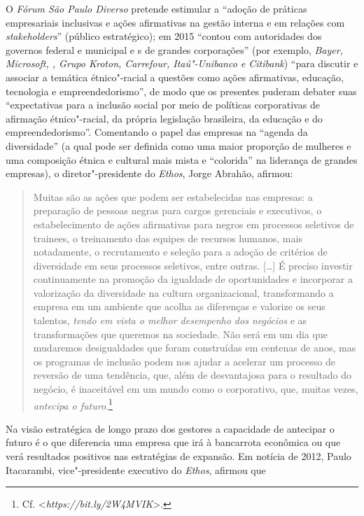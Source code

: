 O \emph{Fórum São Paulo Diverso} pretende estimular a ``adoção de
práticas empresariais inclusivas e ações afirmativas na gestão interna e
em relações com \emph{stakeholders}'' (público estratégico); em 2015
``contou com autoridades dos governos federal e municipal e s de
grandes corporações'' (por exemplo, \emph{Bayer, Microsoft, , Grupo
Kroton, Carrefour, Itaú"-Unibanco e Citibank}) ``para discutir e associar
a temática étnico"-racial a questões como ações afirmativas, educação,
tecnologia e empreendedorismo'', de modo que os presentes puderam
debater suas ``expectativas para a inclusão social por meio de políticas
corporativas de afirmação étnico"-racial, da própria legislação
brasileira, da educação e do empreendedorismo''. Comentando o papel das
empresas na ``agenda da diversidade'' (a qual pode ser definida como uma
maior proporção de mulheres e uma composição étnica e cultural mais
mista e ``colorida'' na liderança de grandes empresas), o
diretor"-presidente do \emph{Ethos}, Jorge Abrahão, afirmou:

\begin{quote}
Muitas são as ações que podem ser estabelecidas nas empresas: a
preparação de pessoas negras para cargos gerenciais e executivos, o
estabelecimento de ações afirmativas para negros em processos seletivos
de trainees, o treinamento das equipes de recursos humanos, mais
notadamente, o recrutamento e seleção para a adoção de critérios de
diversidade em seus processos seletivos, entre outras. {[}\ldots{}{]} É
preciso investir continuamente na promoção da igualdade de oportunidades
e incorporar a valorização da diversidade na cultura organizacional,
transformando a empresa em um ambiente que acolha as diferenças e
valorize os seus talentos, \emph{tendo em vista o melhor desempenho
dos negócios} e as transformações que queremos na sociedade. Não será em
um dia que mudaremos desigualdades que foram construídas em centenas de
anos, mas os programas de inclusão podem nos ajudar a acelerar um
processo de reversão de uma tendência, que, além de desvantajosa para o
resultado do negócio, é inaceitável em um mundo como o corporativo, que,
muitas vezes, \emph{antecipa o futuro}.\footnote{Cf.
  \textless{}\emph{https://bit.ly/2W4MVIK}\textgreater{}.}
\end{quote}

Na visão estratégica de longo prazo dos gestores a capacidade de
antecipar o futuro é o que diferencia uma empresa que irá à bancarrota
econômica ou que verá resultados positivos nas estratégias de expansão.
Em notícia de 2012, Paulo Itacarambi, vice"-presidente executivo do
\emph{Ethos}, afirmou que

